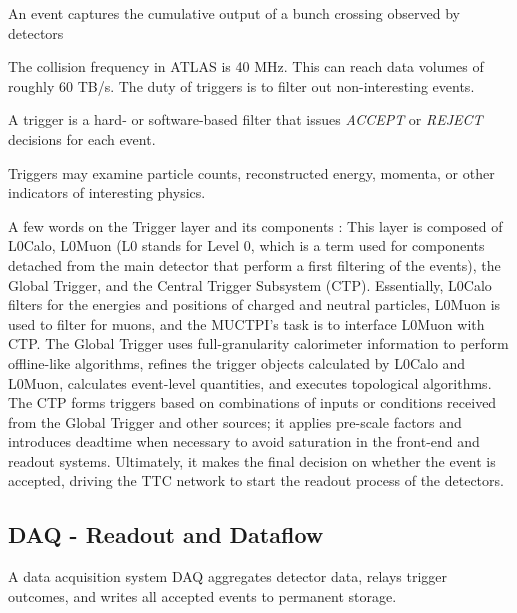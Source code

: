 \begin{definition}
\label{def:event}
An event captures the cumulative output of a bunch crossing observed by detectors
\end{definition}

The collision frequency in \acs{ATLAS} is 40 MHz. This can reach data volumes of roughly 60 TB/s. The duty of triggers is to filter out non-interesting events.

\begin{definition}
\label{def:trigger}
A trigger is a hard- or software-based filter that issues \emph{ACCEPT} or \emph{REJECT} decisions for each event.
\end{definition}

Triggers may examine particle counts, reconstructed energy, momenta, or other indicators of interesting physics.

A few words on the Trigger layer and its components \cite{tdaq}:
This layer is composed of \acs{L0Calo}, \acs{L0Muon} (\acs{L0} stands for Level 0, which is a term used for components detached from the main detector that perform a first filtering of the events), the Global Trigger, and the Central Trigger Subsystem (\acs{CTP}). Essentially, \acs{L0Calo} filters for the energies and positions of charged and neutral particles, \acs{L0Muon} is used to filter for muons, and the \acs{MUCTPI}'s task is to interface \acs{L0Muon} with \acs{CTP}. The Global Trigger \cite{tdaq} uses full-granularity calorimeter information to perform offline-like algorithms, refines the trigger objects calculated by \acs{L0Calo} and \acs{L0Muon}, calculates event-level quantities, and executes topological algorithms. The \acs{CTP} \cite{tdaq} forms triggers based on combinations of inputs or conditions received from the Global Trigger and other sources; it applies pre-scale factors and introduces deadtime when necessary to avoid saturation in the front-end and readout systems. Ultimately, it makes the final decision on whether the event is accepted, driving the \acs{TTC} network to start the readout process of the detectors.

\subsection{\acs{DAQ} - Readout and Dataflow}

\begin{definition}
\label{def:daq}
A data acquisition system \acs{DAQ} aggregates detector data, relays trigger outcomes, and writes all accepted events to permanent storage.
\end{definition}

